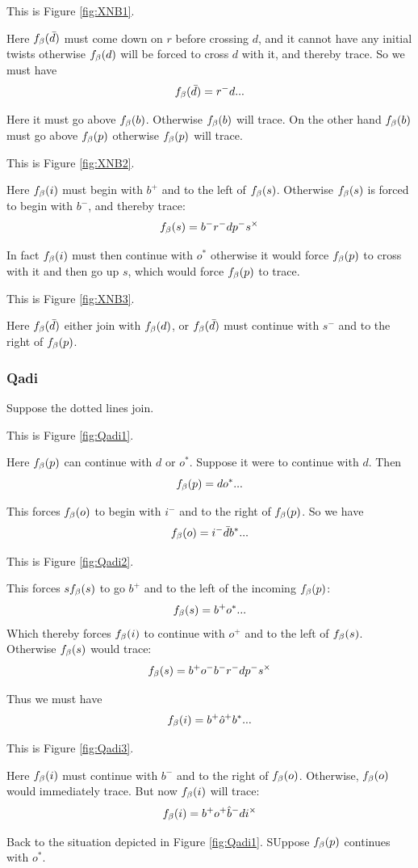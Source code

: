 This is Figure \ref{fig:XNB1}.

Here $f_\beta(\bar{d})$ must come down on $r$ before crossing $d$, and it cannot have any initial twists otherwise $f_\beta(d)$ will be forced to cross $d$ with it, and thereby trace. So we must have
\[
f_\beta(\bar{d}) = r^- d...
\]

Here it must go above $f_\beta(b)$. Otherwise $f_\beta(b)$ will trace. On the other hand $f_\beta(b)$ must go above $f_\beta(p)$ otherwise $f_\beta(p)$ will trace. 

This is Figure \ref{fig:XNB2}.

Here $f_\beta(i)$ must begin with $b^+$ and to the left of $f_\beta(s)$. Otherwise $f_\beta(s)$ is forced to begin with $b^-$, and thereby trace:
\[
f_\beta(s) = b^- r^- d p^- s^\times
\]

In fact $f_\beta(i)$ must then continue with $o^*$ otherwise it would force $f_\beta(p)$ to cross with it and then go up $s$, which would force $f_\beta(p)$ to trace.

This is Figure \ref{fig:XNB3}.

Here $f_\beta(\bar{d})$ either join with $f_\beta(d)$, or $f_\beta(\bar{d})$ must continue with $s^-$ and to the right of $f_\beta(p)$.


\subsubsection{Qadi}\label{Qadi}
Suppose the dotted lines join. 

This is Figure \ref{fig:Qadi1}.

Here $f_\beta(p)$ can continue with $d$ or $o^*$. Suppose it were to continue with $d$. Then
\[
f_\beta(p) = d o^*...
\]

This forces $f_\beta(o)$ to begin with $i^-$ and to the right of $f_\beta(p)$. So we have
\[
f_\beta(o) = i^- \bar{d} b^*...
\]

This is Figure \ref{fig:Qadi2}.

This forces $sf_\beta(s)$ to go $b^+$ and to the left of the incoming $f_\beta(p)$:
\[ 
f_\beta(s) = b^+ o^*...
\]
Which thereby forces $f_\beta(i)$ to continue with $o^+$ and to the left of $f_\beta(s)$. Otherwise $f_\beta(s)$ would trace:
\[
f_\beta(s) = b^+ o^- b^- r^- d p^- s^\times
\]

Thus we must have
\[
f_\beta(i) = b^+ \hat{o}^+ b^*...
\]

This is Figure \ref{fig:Qadi3}.

Here $f_\beta(i)$ must continue with $b^-$ and to the right of $f_\beta(o)$. Otherwise, $f_\beta(o)$ would immediately trace. But now $f_\beta(i)$ will trace:
\[
f_\beta(i) = b^+ o^+ \hat{b}^- d i^\times
\]


Back to the situation depicted in Figure \ref{fig:Qadi1}. SUppose $f_\beta(p)$ continues with $o^*$.

